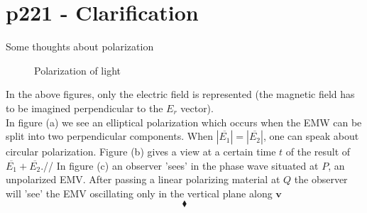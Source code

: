\section{p221 - Clarification}
\begin{tcolorbox}
Some thoughts about polarization
\end{tcolorbox}


\begin{figure}[H]%
    \centering
    \subfloat[]{}
    \quad
        \subfloat[]{}
    \quad
        \subfloat[]{}
    \quad
\caption{Polarization of light}
\label{fig:fig_p221}
\end{figure}
In the above figures, only the electric field is represented (the magnetic field has to be imagined perpendicular to the $E_r$ vector).\\
In figure (a) we see an elliptical polarization which occurs when the EMW can be split into two perpendicular components. When $\left|\overline{E_1}\right|= \left|\overline{E_2}\right|$, one can speak about circular polarization. Figure (b) gives a view at a certain time $t$ of the result of $\overline{E_1}+\overline{E_2}$.//
In figure (c) an observer 'sees' in the phase wave situated at $P$, an unpolarized EMV. After passing a linear polarizing material at $Q$ the observer will 'see' the EMV oscillating only in the vertical plane along $\mathbf{v}$ 
 $$\blacklozenge$$
\newpage


